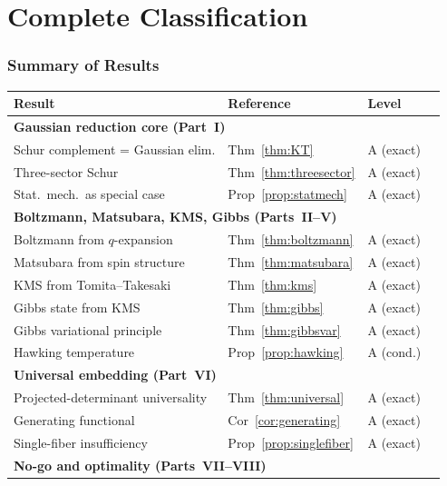 \documentclass[12pt]{article}
\theoremstyle{plain}
\theoremstyle{definition}
\numberwithin{equation}{section}
\begin{document}
\part{Complete Classification}

\section{Summary of Results}\label{sec:summary}

\begin{center}
\begin{tabular}{p{5.5cm}lll}
\toprule
Result & Reference & Level\\
\midrule
\multicolumn{3}{l}{\textbf{Gaussian reduction core (Part~I)}}\\
\quad Schur complement = Gaussian elim. & Thm~\ref{thm:KT} & A (exact)\\
\quad Three-sector Schur & Thm~\ref{thm:threesector} & A (exact)\\
\quad Stat.~mech.~as special case & Prop~\ref{prop:statmech} & A (exact)\\
\midrule
\multicolumn{3}{l}{\textbf{Boltzmann, Matsubara, KMS, Gibbs (Parts~II--V)}}\\
\quad Boltzmann from $q$-expansion & Thm~\ref{thm:boltzmann} & A (exact)\\
\quad Matsubara from spin structure & Thm~\ref{thm:matsubara} & A (exact)\\
\quad KMS from Tomita--Takesaki & Thm~\ref{thm:kms} & A (exact)\\
\quad Gibbs state from KMS & Thm~\ref{thm:gibbs} & A (exact)\\
\quad Gibbs variational principle & Thm~\ref{thm:gibbsvar} & A (exact)\\
\quad Hawking temperature & Prop~\ref{prop:hawking} & A (cond.)\\
\midrule
\multicolumn{3}{l}{\textbf{Universal embedding (Part~VI)}}\\
\quad Projected-determinant universality & Thm~\ref{thm:universal} & A (exact)\\
\quad Generating functional & Cor~\ref{cor:generating} & A (exact)\\
\quad Single-fiber insufficiency & Prop~\ref{prop:singlefiber} & A (exact)\\
\midrule
\multicolumn{3}{l}{\textbf{No-go and optimality (Parts~VII--VIII)}}\\

\end{tabular}
\end{center}
\end{document}

